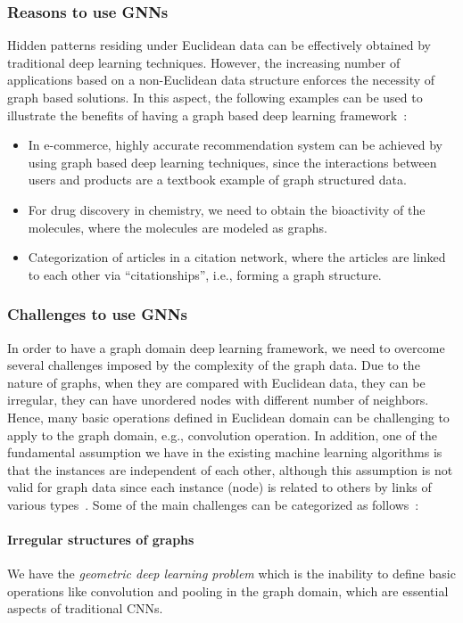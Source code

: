 \subsubsection{Reasons to use GNNs}
Hidden patterns residing under Euclidean data can be effectively obtained by traditional deep learning techniques. However, the increasing number of applications based on a non-Euclidean data structure enforces the necessity of graph based solutions. In this aspect, the following examples can be used to illustrate the benefits of having a graph based deep learning framework~\autocite{wu21gnn}:
\begin{itemize}
    \item In e-commerce, highly accurate recommendation system can be achieved by using graph based deep learning techniques, since the interactions between users and products are a textbook example of graph structured data.
    \item For drug discovery in chemistry, we need to obtain the bioactivity of the molecules, where the molecules are modeled as graphs.
    \item Categorization of articles in a citation network, where the articles are linked to each other via ``citationships'', i.e., forming a graph structure.
\end{itemize}

\subsubsection{Challenges to use GNNs}
In order to have a graph domain deep learning framework, we need to overcome several challenges imposed by the complexity of the graph data. Due to the nature of graphs, when they are compared with Euclidean data, they can be irregular, they can have unordered nodes with different number of neighbors. Hence, many basic operations defined in Euclidean domain can be challenging to apply to the graph domain, e.g., convolution operation. In addition, one of the fundamental assumption we have in the existing machine learning algorithms is that the instances are independent of each other, although this assumption is not valid for graph data since each instance (node) is related to others by links of various types~\autocite{wu21gnn}. Some of the main challenges can be categorized as follows~\autocite{zhang18dlongraphs}:

\paragraph{Irregular structures of graphs} We have the \emph{geometric deep learning problem} which is the inability to define basic operations like convolution and pooling in the graph domain, which are essential aspects of traditional CNNs.

